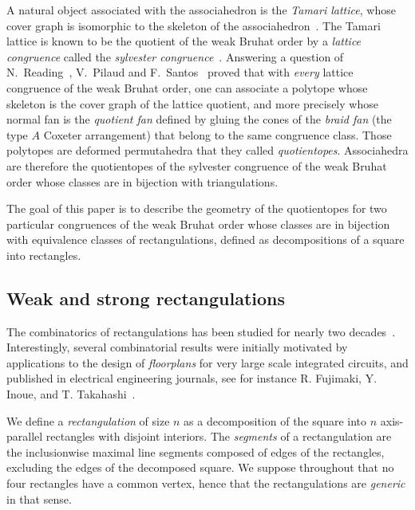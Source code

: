 \documentclass{amsart}
\theoremstyle{definition}
\newcommand{\darkblue}{\color{darkblue}} %
\newcommand{\defn}[1]{\textsl{\darkblue #1}} %
\begin{document}
A natural object associated with the associahedron is the \defn{Tamari lattice}, whose cover graph is isomorphic to the skeleton of the associahedron~\cite{MR0146227,MR3235205}.
The Tamari lattice is known to be the quotient of the weak Bruhat order by a \defn{lattice congruence} called the \defn{sylvester congruence}~\cite{MR1654173,MR2142078}.
Answering a question of N.~Reading~\cite{MR2142177}, V.~Pilaud and F.~Santos~\cite{MR3964495} proved that with \emph{every} lattice congruence of the weak Bruhat order, one can associate a polytope whose skeleton is the cover graph of the lattice quotient, and more precisely whose normal fan is the \defn{quotient fan} defined by gluing the cones of the \defn{braid fan} (the type $A$ Coxeter arrangement) that belong to the same congruence class.
Those polytopes are deformed permutahedra that they called \defn{quotientopes}.
Associahedra are therefore the quotientopes of the sylvester congruence of the weak Bruhat order whose classes are in bijection with triangulations.

The goal of this paper is to describe the geometry of the quotientopes for two particular congruences of the weak Bruhat order whose classes are in bijection with equivalence classes of rectangulations, defined as decompositions of a square into rectangles.

\subsection{Weak and strong rectangulations}

The combinatorics of rectangulations has been studied for nearly two decades~\cite{MR2233287,MR2763051,MR2871762,MR2864445,MR3084577,MR3192492,MR3878132,MR4598046}.
Interestingly, several combinatorial results were initially motivated by applications to the design of \defn{floorplans} for very large scale integrated circuits, and published in electrical engineering journals, see for instance R. Fujimaki, Y. Inoue, and T. Takahashi~\cite{FT07,TF08,ITF09,FIT09}.

We define a \defn{rectangulation} of size $n$ as a decomposition of the square into $n$ axis-parallel rectangles with disjoint interiors.
The \defn{segments} of a rectangulation are the inclusionwise maximal line segments composed of edges of the rectangles, excluding the edges of the decomposed square.
We suppose throughout that no four rectangles have a common vertex, hence that the rectangulations are \defn{generic} in that sense.
\end{document}
